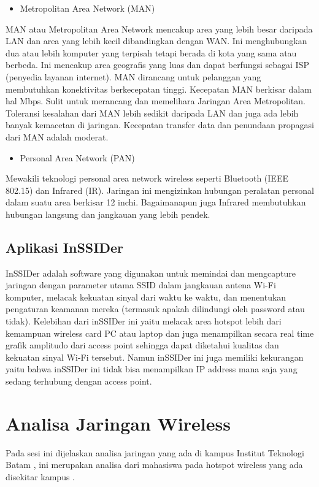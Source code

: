 \documentclass[conference]{IEEEtran}
\begin{document}
\begin{itemize}
    \item Metropolitan Area Network (MAN)
\end{itemize}
MAN atau Metropolitan Area Network mencakup area yang lebih besar daripada LAN dan area yang lebih kecil dibandingkan dengan WAN.
Ini menghubungkan dua atau lebih komputer yang terpisah tetapi berada di kota yang sama atau berbeda. 
Ini mencakup area geografis yang luas dan dapat berfungsi sebagai ISP (penyedia layanan internet).
MAN dirancang untuk pelanggan yang membutuhkan konektivitas berkecepatan tinggi.
Kecepatan MAN berkisar dalam hal Mbps. Sulit untuk merancang dan memelihara Jaringan Area Metropolitan. 
Toleransi kesalahan dari MAN lebih sedikit daripada LAN dan juga ada lebih banyak kemacetan di jaringan.
Kecepatan transfer data dan penundaan propagasi dari MAN adalah moderat.

\begin{itemize}
    \item Personal Area Network (PAN)
\end{itemize}
Mewakili teknologi personal area network wireless seperti Bluetooth (IEEE 802.15) dan Infrared (IR). 
Jaringan ini mengizinkan hubungan peralatan personal dalam suatu area berkisar 12 inchi. 
Bagaimanapun juga Infrared membutuhkan hubungan langsung dan jangkauan yang lebih pendek.~\cite{yudianto2014jaringan}

\subsection{Aplikasi InSSIDer}

InSSIDer adalah software yang digunakan untuk memindai dan mengcapture jaringan dengan parameter utama SSID dalam jangkauan antena Wi-Fi komputer, melacak kekuatan sinyal dari waktu ke waktu, dan menentukan pengaturan keamanan mereka (termasuk apakah dilindungi oleh password atau tidak).
Kelebihan dari inSSIDer ini yaitu melacak area hotspot lebih dari kemampuan wireless card PC atau laptop dan juga menampilkan secara real time grafik amplitudo dari access point sehingga dapat diketahui kualitas dan kekuatan sinyal Wi-Fi tersebut. Namun inSSIDer ini juga memiliki kekurangan yaitu bahwa inSSIDer ini tidak bisa menampilkan IP address mana saja yang sedang terhubung dengan access point.


\section{Analisa Jaringan Wireless}
Pada sesi ini dijelaskan analisa jaringan yang ada di kampus Institut Teknologi Batam , ini merupakan analisa dari mahasiswa
pada hotspot wireless yang ada disekitar kampus . 
\end{document}
